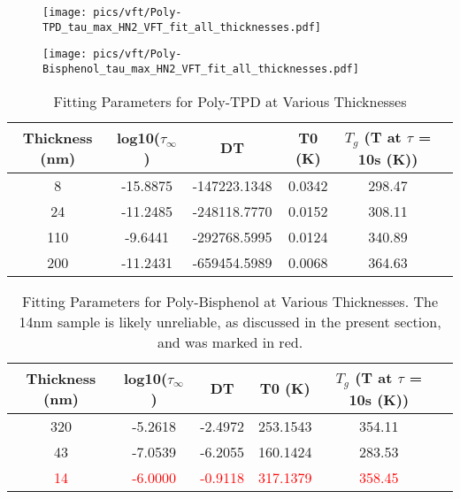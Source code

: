 \begin{figure}[t]%
  \centering
  \texttt{[image: pics/vft/Poly-TPD\_tau\_max\_HN2\_VFT\_fit\_all\_thicknesses.pdf]}
  \caption{}
  \label{vfttpd}
\end{figure}%

\begin{figure}[t]%
  \centering
  \texttt{[image: pics/vft/Poly-Bisphenol\_tau\_max\_HN2\_VFT\_fit\_all\_thicknesses.pdf]}
  \caption{}
  \label{vftbis}
\end{figure}%


\begin{table}[h]
    \caption{Fitting Parameters for Poly-TPD at Various Thicknesses}
    \label{tab:fitting-parameters-ptpd}
    \begin{center}
    \begin{tabular}{@{}cccccc@{}}
    \toprule
    Thickness (nm) & log10($\tau_\infty$) & DT & T0 (K) & $T_g$ (T at $\tau$ = 10s (K)) \\ \midrule
    8   & -15.8875 & -147223.1348 & 0.0342 & 298.47 \\
    24  & -11.2485 & -248118.7770 & 0.0152 & 308.11 \\
    110 & -9.6441 & -292768.5995 & 0.0124 & 340.89 \\
    200 & -11.2431 & -659454.5989 & 0.0068 & 364.63 \\
    \bottomrule
    \end{tabular}
    \end{center}
\end{table}

\begin{table}[h]
    \caption{Fitting Parameters for Poly-Bisphenol at Various Thicknesses. The 14nm sample is likely unreliable, as discussed in the present section, and was marked in red.}
    \label{tab:fitting-parameters-bisphenol}
    \begin{center}
    \begin{tabular}{@{}cccccc@{}}
    \toprule
    Thickness (nm) & log10($\tau_\infty$) & DT & T0 (K) & $T_g$ (T at $\tau$ = 10s (K)) \\ \midrule
    320 & -5.2618 & -2.4972 & 253.1543 & 354.11 \\
    43  & -7.0539 & -6.2055 & 160.1424 & 283.53 \\
    \textcolor{red}{14}  & \textcolor{red}{-6.0000} & \textcolor{red}{-0.9118} & \textcolor{red}{317.1379} & \textcolor{red}{358.45} \\ %
    \bottomrule
    \end{tabular}
    \end{center}
\end{table}

